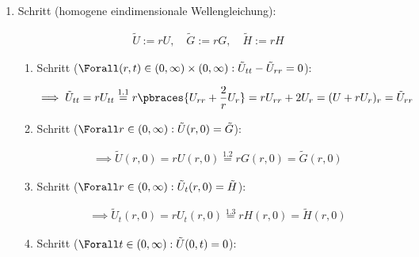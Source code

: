\begin{solution}
\begin{enumerate}[label = \arabic*.]
\begin{enumerate}[label = 1.\arabic*.]
    \end{enumerate}

    \item Schritt (homogene eindimensionale Wellengleichung):

    \begin{align*}
        \tilde U := r U,
        \quad
        \tilde G := r G,
        \quad
        \tilde H := r H
    \end{align*}

    \begin{enumerate}[label = 2.\arabic*.]

        \item Schritt ($\Forall (r, t) \in (0, \infty) \times (0, \infty): \tilde U_{tt} - \tilde U_{rr} = 0$):
        
        \begin{align*}
            \implies
            \tilde U_{tt}
            =
            r U_{tt}
            \stackrel
            {
                \mathrm{1.1}
            }{=}
            r \pbraces{U_{rr} + \frac{2}{r} U_r}
            =
            r U_{rr} + 2 U_r
            =
            (U + r U_r)_r
            =
            \tilde U_{rr}
        \end{align*}

        \item Schritt ($\Forall r \in (0, \infty): \tilde U(r, 0) = \tilde G$):
        
        \begin{align*}
            \implies
            \tilde U(r, 0)
            =
            r U(r, 0)
            \stackrel
            {
                \mathrm{1.2}
            }{=}
            r G(r, 0)
            =
            \tilde G(r, 0)
        \end{align*}

        \item Schritt ($\Forall r \in (0, \infty): \tilde U_t(r, 0) = \tilde H$):
        
        \begin{align*}
            \implies
            \tilde U_t(r, 0)
            =
            r U_t(r, 0)
            \stackrel
            {
                \mathrm{1.3}
            }{=}
            r H(r, 0)
            =
            \tilde H(r, 0)
        \end{align*}

        \item Schritt ($\Forall t \in (0, \infty): \tilde U(0, t) = 0$):
        

\end{enumerate}
\end{enumerate}
\end{solution}
